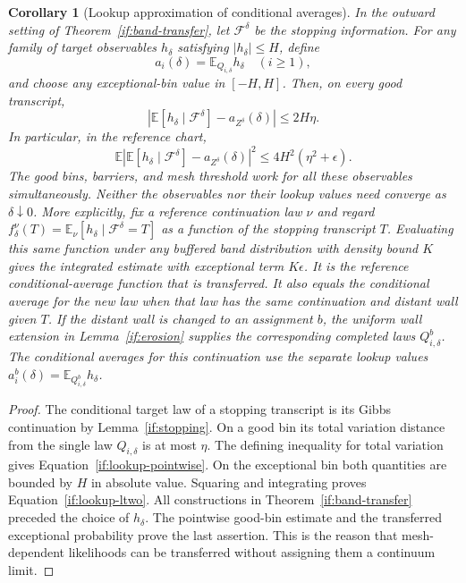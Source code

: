 \documentclass[11pt]{article}
\newtheorem{corollary}[theorem]{Corollary}
\theoremstyle{definition}
\theoremstyle{remark}
\numberwithin{equation}{section}
\begin{document}
\begin{corollary}[Lookup approximation of conditional averages]
\label{if:descriptor-averages}
In the outward setting of Theorem~\ref{if:band-transfer}, let
$\mathcal F^\delta$ be the stopping information.  For any family
of target observables $h_\delta$ satisfying $|h_\delta|\le H$, define
\[
       a_i(\delta)=\mathbb E_{Q_{i,\delta}}h_\delta
             \quad (i\ge1),
\]
and choose any exceptional-bin value in $[-H,H]$.  Then, on every
good transcript,
\begin{equation}\label{if:lookup-pointwise}
  \left|\mathbb E[h_\delta\mid\mathcal F^\delta]
             -a_{Z^\delta}(\delta)\right|\le 2H\eta.
\end{equation}
In particular, in the reference chart,
\begin{equation}\label{if:lookup-ltwo}
  \mathbb E\left|\mathbb E[h_\delta\mid\mathcal F^\delta]
             -a_{Z^\delta}(\delta)\right|^2
                  \le 4H^2(\eta^2+\epsilon).
\end{equation}
The good bins, barriers, and mesh threshold work for all these
observables simultaneously.  Neither the observables nor their
lookup values need converge as $\delta\downarrow0$.  More explicitly,
fix a reference continuation law $\nu$ and regard
$f_\delta^\nu(T)=\mathbb E_\nu[h_\delta\mid\mathcal F^\delta=T]$
as a function of the stopping transcript $T$.  Evaluating this same
function under any buffered band distribution with density bound
$K$ gives the integrated estimate with exceptional term $K\epsilon$.
It is the reference conditional-average function that is transferred.
It also equals the conditional average for the new law when that
law has the same continuation and distant wall given $T$.
If the distant wall is changed to an assignment $b$, the uniform
wall extension in Lemma~\ref{if:erosion} supplies the corresponding
completed laws $Q_{i,\delta}^{b}$. The conditional averages for this
continuation use the separate lookup values
$a_i^{b}(\delta)=\mathbb E_{Q_{i,\delta}^{b}}h_\delta$.
\end{corollary}

\begin{proof}
The conditional target law of a stopping transcript is its Gibbs
continuation by Lemma~\ref{if:stopping}.  On a good bin its total
variation distance from the single law $Q_{i,\delta}$ is at most
$\eta$.  The defining inequality for total variation gives
Equation~\eqref{if:lookup-pointwise}.  On the exceptional bin both
quantities are bounded by $H$ in absolute value.  Squaring and
integrating proves Equation~\eqref{if:lookup-ltwo}.  All constructions
in Theorem~\ref{if:band-transfer} preceded the choice of $h_\delta$.
The pointwise good-bin estimate and the transferred exceptional
probability prove the last assertion.  This is the reason that
mesh-dependent likelihoods can be transferred without assigning
them a continuum limit.
\end{proof}
\end{document}

